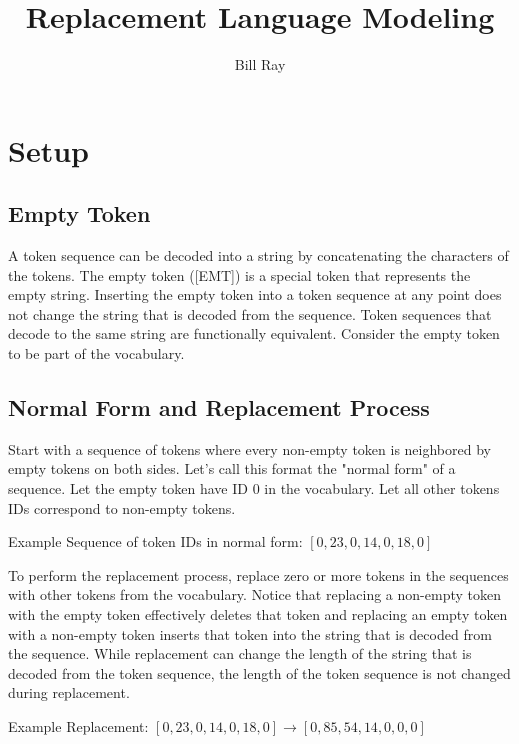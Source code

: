 \documentclass{article}
\title{Replacement Language Modeling}
\author{Bill Ray}
\begin{document}
\maketitle

\section{Setup}

\subsection{Empty Token}
A token sequence can be decoded into a string by concatenating the characters of the tokens. The empty token ([EMT]) is a special token that represents the empty string. Inserting the empty token into a token sequence at any point does not change the string that is decoded from the sequence. Token sequences that decode to the same string are functionally equivalent. Consider the empty token to be part of the vocabulary.

\subsection{Normal Form and Replacement Process}
Start with a sequence of tokens where every non-empty token is neighbored by empty tokens on both sides. Let's call this format the "normal form" of a sequence. Let the empty token have ID $0$ in the vocabulary. Let all other tokens IDs correspond to non-empty tokens.

\vspace*{1em}
\noindent Example Sequence of token IDs in normal form: $[0, 23, 0, 14, 0, 18, 0]$
\vspace*{1em}

To perform the replacement process, replace zero or more tokens in the sequences with other tokens from the vocabulary. Notice that replacing a non-empty token with the empty token effectively deletes that token and replacing an empty token with a non-empty token inserts that token into the string that is decoded from the sequence. While replacement can change the length of the string that is decoded from the token sequence, the length of the token sequence is not changed during replacement.

\vspace*{1em}
\noindent Example Replacement: $[0, 23, 0, 14, 0, 18, 0] \rightarrow [0, 85, 54, 14, 0, 0, 0]$
\vspace*{1em}
\end{document}
